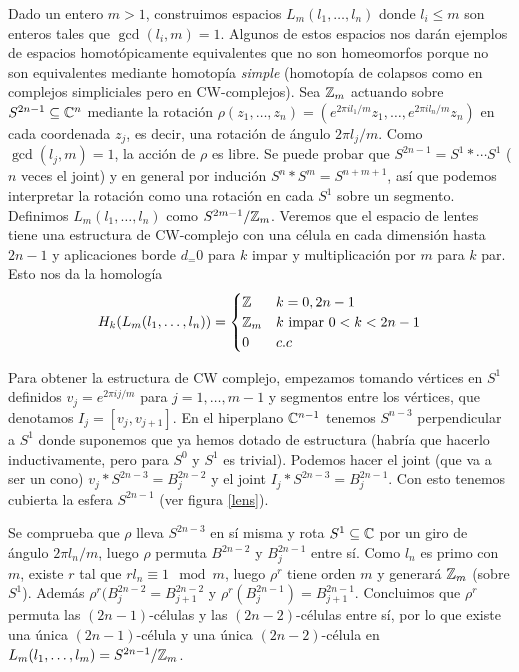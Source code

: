 \documentclass[TA.tex]{subfiles}
\begin{document}
\begin{ej}
Dado un entero $m>1$, construimos espacios $L_m(l_1,\dots, l_n)$ donde $l_i\leq m$ son enteros tales que $\gcd(l_i,m)=1$. Algunos de estos espacios nos darán ejemplos de espacios homotópicamente equivalentes que no son homeomorfos porque no son equivalentes mediante homotopía \emph{simple} (homotopía de colapsos como en complejos simpliciales pero en CW-complejos). Sea $\mathbb{Z}_m$ actuando sobre $S^{2n-1}\subseteq\mathbb{C}^n$ mediante la rotación $\rho(z_1,\dots, z_n)=(e^{2\pi il_1/m}z_1,\dots, e^{2\pi il_n/m}z_n)$ en cada coordenada $z_j$, es decir, una rotación de ángulo $2\pi l_j/m$. Como $\gcd(l_j,m)=1$, la acción de $\rho$ es libre. Se puede probar que $S^{2n-1}=S^1*\cdots S^1$ ($n$ veces el joint) y en general por indución $S^n*S^m=S^{n+m+1}$, así que podemos interpretar la rotación como una rotación en cada $S^1$ sobre un segmento. Definimos $L_m(l_1,\dots, l_n)$ como $S^{2m-1}/\mathbb{Z}_m$. Veremos que el espacio de lentes tiene una estructura de CW-complejo con una célula en cada dimensión hasta $2n-1$ y aplicaciones borde $d_=0$ para $k$ impar y multiplicación por $m$ para $k$ par. Esto nos da la homología 
$$H_k(L_m(l_1,\dots, l_n))=\begin{cases}
\mathbb{Z} & k=0,2n-1\\
\mathbb{Z}_m & k\text{ impar } 0<k<2n-1\\
0 & c.c
\end{cases}$$

Para obtener la estructura de CW complejo, empezamos tomando vértices en $S^1$ definidos $v_j=e^{2\pi i j/m}$ para $j=1,\dots, m-1$ y segmentos entre los vértices, que denotamos $I_j=[v_j,v_{j+1}]$. En el hiperplano $\mathbb{C}^{n-1}$ tenemos $S^{n-3}$ perpendicular a $S^1$ donde suponemos que ya hemos dotado de estructura (habría que hacerlo inductivamente, pero para $S^0$ y $S^1$ es trivial). Podemos hacer el joint (que va a ser un cono) $v_j*S^{2n-3}=B_j^{2n-2}$ y el joint $I_j*S^{2n-3}=B_j^{2n-1}$. Con esto tenemos cubierta la esfera $S^{2n-1}$ (ver figura \ref{lens}).  


Se comprueba que $\rho$ lleva $S^{2n-3}$ en sí misma y rota $S^1\subseteq \mathbb{C}$ por un giro de ángulo $2\pi l_n/m$, luego $\rho$ permuta $B^{2n-2}$ y $B^{2n-1}_j$ entre sí. Como $l_n$ es primo con $m$, existe $r$ tal que $rl_n\equiv 1\mod m$, luego $\rho^r$ tiene orden $m$ y generará $\mathbb{Z}_m$ (sobre $S^1$). Además $\rho^r(B_j^{2n-2}=B_{j+1}^{2n-2}$ y $\rho^r(B_j^{2n-1})=B_{j+1}^{2n-1}$. Concluimos que $\rho^r$ permuta las $(2n-1)$-células y las $(2n-2)$-células entre sí, por lo que existe una única $(2n-1)$-célula y una única $(2n-2)$-célula en $L_m(l_1,\dots, l_m)=S^{2n-1}/\mathbb{Z}_m$. 


\end{ej}
\end{document}
